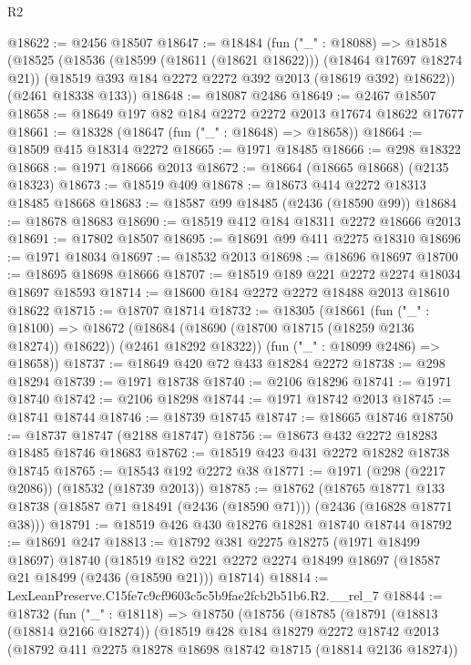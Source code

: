 \begin{lexlean}{R2}
\begin{coremodule}
@18622 := @2456 @18507
@18647 := @18484
    (fun ("_" : @18088) =>
    @18518
      (@18525
        (@18536 (@18599 (@18611 (@18621 @18622))) (@18464 @17697 @18274 @21))
        (@18519 @393 @184 @2272 @2272 @392 @2013 (@18619 @392) @18622))
      (@2461 @18338 @133))
@18648 := @18087 @2486
@18649 := @2467 @18507
@18658 := @18649 @197 @82 @184 @2272 @2272 @2013 @17674 @18622 @17677
@18661 := @18328 (@18647 (fun ("_" : @18648) => @18658))
@18664 := @18509 @415 @18314 @2272
@18665 := @1971 @18485
@18666 := @298 @18322
@18668 := @1971 @18666 @2013
@18672 := @18664 (@18665 @18668) (@2135 @18323)
@18673 := @18519 @409
@18678 := @18673 @414 @2272 @18313 @18485 @18668
@18683 := @18587 @99 @18485 (@2436 (@18590 @99))
@18684 := @18678 @18683
@18690 := @18519 @412 @184 @18311 @2272 @18666 @2013
@18691 := @17802 @18507
@18695 := @18691 @99 @411 @2275 @18310
@18696 := @1971 @18034
@18697 := @18532 @2013
@18698 := @18696 @18697
@18700 := @18695 @18698 @18666
@18707 := @18519 @189 @221 @2272 @2274 @18034 @18697 @18593
@18714 := @18600 @184 @2272 @2272 @18488 @2013 @18610 @18622
@18715 := @18707 @18714
@18732 := @18305
    (@18661
      (fun ("_" : @18100) =>
      @18672 (@18684 (@18690 (@18700 @18715 (@18259 @2136 @18274)) @18622)) (@2461 @18292 @18322))
      (fun ("_" : @18099 @2486) => @18658))
@18737 := @18649 @420 @72 @433 @18284 @2272
@18738 := @298 @18294
@18739 := @1971 @18738
@18740 := @2106 @18296
@18741 := @1971 @18740
@18742 := @2106 @18298
@18744 := @1971 @18742 @2013
@18745 := @18741 @18744
@18746 := @18739 @18745
@18747 := @18665 @18746
@18750 := @18737 @18747 (@2188 @18747)
@18756 := @18673 @432 @2272 @18283 @18485 @18746 @18683
@18762 := @18519 @423 @431 @2272 @18282 @18738 @18745
@18765 := @18543 @192 @2272 @38
@18771 := @1971 (@298 (@2217 @2086)) (@18532 (@18739 @2013))
@18785 := @18762
    (@18765 @18771 @133 @18738 (@18587 @71 @18491 (@2436 (@18590 @71))) (@2436 (@16828 @18771 @38)))
@18791 := @18519 @426 @430 @18276 @18281 @18740 @18744
@18792 := @18691 @247
@18813 := @18792
    @381
    @2275
    @18275
    (@1971 @18499 @18697)
    @18740
    (@18519 @182 @221 @2272 @2274 @18499 @18697 (@18587 @21 @18499 (@2436 (@18590 @21))) @18714)
@18814 := LexLeanPreserve.C15fe7c9cf9603c5c5b9fae2fcb2b51b6.R2.__rel_7
@18844 := @18732
    (fun ("_" : @18118) =>
    @18750
      (@18756
        (@18785
          (@18791
            (@18813 (@18814 @2166 @18274))
            (@18519
              @428
              @184
              @18279
              @2272
              @18742
              @2013
              (@18792 @411 @2275 @18278 @18698 @18742 @18715 (@18814 @2136 @18274))

\end{coremodule}
\end{lexlean}
